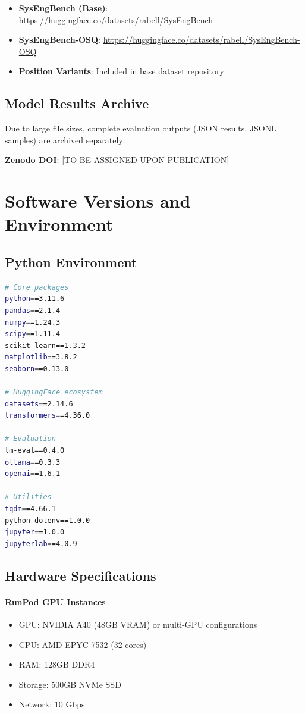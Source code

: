 \begin{itemize}
    \item \textbf{SysEngBench (Base)}: \url{https://huggingface.co/datasets/rabell/SysEngBench}
    \item \textbf{SysEngBench-OSQ}: \url{https://huggingface.co/datasets/rabell/SysEngBench-OSQ}
    \item \textbf{Position Variants}: Included in base dataset repository
\end{itemize}

\subsection{Model Results Archive}

Due to large file sizes, complete evaluation outputs (JSON results, JSONL samples) are archived separately:

\textbf{Zenodo DOI}: [TO BE ASSIGNED UPON PUBLICATION]

\section{Software Versions and Environment}\label{app:environment}

\subsection{Python Environment}

\begin{lstlisting}[language=bash,basicstyle=\small\ttfamily]
# Core packages
python==3.11.6
pandas==2.1.4
numpy==1.24.3
scipy==1.11.4
scikit-learn==1.3.2
matplotlib==3.8.2
seaborn==0.13.0

# HuggingFace ecosystem
datasets==2.14.6
transformers==4.36.0

# Evaluation
lm-eval==0.4.0
ollama==0.3.3
openai==1.6.1

# Utilities
tqdm==4.66.1
python-dotenv==1.0.0
jupyter==1.0.0
jupyterlab==4.0.9
\end{lstlisting}

\subsection{Hardware Specifications}

\paragraph{RunPod GPU Instances}
\begin{itemize}
    \item GPU: NVIDIA A40 (48GB VRAM) or multi-GPU configurations
    \item CPU: AMD EPYC 7532 (32 cores)
    \item RAM: 128GB DDR4
    \item Storage: 500GB NVMe SSD
    \item Network: 10 Gbps
\end{itemize}

